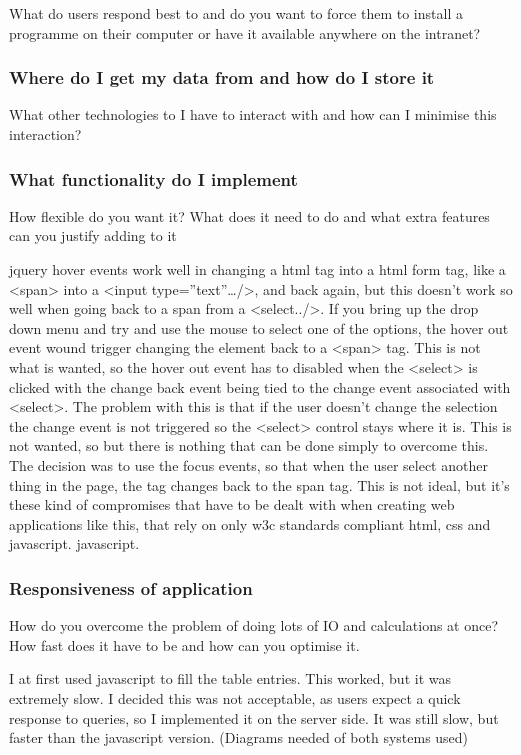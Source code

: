 \documentclass[11pt]{article}
\begin{document}
What do users respond best to and do you want to force them to install
a programme on their computer or have it available anywhere on the intranet?
\subsubsection{Where do I get my data from and how do I store it}
\label{sec-2_2_7}

What other technologies to I have to interact with and how can I
minimise this interaction?
\subsubsection{What functionality do I implement}
\label{sec-2_2_8}

How flexible do you want it?  What does it need to do and what extra
features can you justify adding to it

jquery hover events work well in changing a html tag into a html form
tag, like a <span> into a <input type=''text''\ldots{}/>, and back again, but
this doesn't work so well when going back to a span from a
<select../>.  If you bring up the drop down menu and try and use the
mouse to select one of the options, the hover out event wound trigger
changing the element back to a <span> tag.  This is not what is
wanted, so the hover out event has to disabled when the <select> is
clicked with the change back event being tied to the change event
associated with <select>.  The problem with this is that if the user
doesn't change the selection the change event is not triggered so the
<select> control stays where it is.  This is not wanted, so but there
is nothing that can be done simply to overcome this.  The decision was
to use the focus events, so that when the user select another thing in
the page, the tag changes back to the span tag.  This is not ideal,
but it's these kind of compromises that have to be dealt with when
creating web applications like this, that rely on only w3c standards
compliant html, css and javascript.
javascript.
\subsubsection{Responsiveness of application}
\label{sec-2_2_9}

How do you overcome the problem of doing lots of IO and calculations
at once?  How fast does it have to be and how can you optimise it.

I at first used javascript to fill the table entries.  This worked,
but it was extremely slow.  I decided this was not acceptable, as
users expect a quick response to queries, so I implemented it on the
server side.  It was still slow, but faster than the javascript
version.  (Diagrams needed of both systems used)
\end{document}
